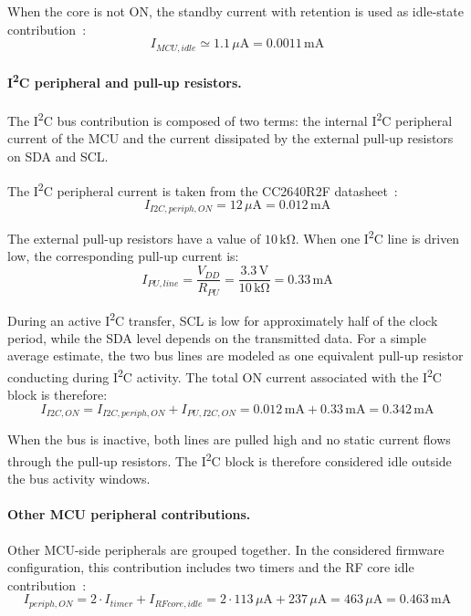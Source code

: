 When the core is not ON, the standby current with retention is used as idle-state contribution~\cite{mcu_datasheet}:
\begin{equation}
	I_{MCU,idle} \simeq 1.1\,\mu\mathrm{A} = 0.0011\,\mathrm{mA}
\end{equation}

\paragraph{I\textsuperscript{2}C peripheral and pull-up resistors.}
The I\textsuperscript{2}C bus contribution is composed of two terms: the internal I\textsuperscript{2}C peripheral current of the MCU and the current dissipated by the external pull-up resistors on SDA and SCL.

The I\textsuperscript{2}C peripheral current is taken from the CC2640R2F datasheet~\cite{mcu_datasheet}:
\begin{equation}
	I_{I2C,periph,ON} = 12\,\mu\mathrm{A} = 0.012\,\mathrm{mA}
\end{equation}

The external pull-up resistors have a value of \(10\,\mathrm{k\Omega}\). 
When one I\textsuperscript{2}C line is driven low, the corresponding pull-up current is:
\begin{equation}
	I_{PU,line} = \frac{V_{DD}}{R_{PU}} = \frac{3.3\,\mathrm{V}}{10\,\mathrm{k\Omega}} = 0.33\,\mathrm{mA}
\end{equation}

During an active I\textsuperscript{2}C transfer, SCL is low for approximately half of the clock period, while the SDA level depends on the transmitted data. 
For a simple average estimate, the two bus lines are modeled as one equivalent pull-up resistor conducting during I\textsuperscript{2}C activity. 
The total ON current associated with the I\textsuperscript{2}C block is therefore:
\begin{equation}
	I_{I2C,ON} = I_{I2C,periph,ON} + I_{PU,I2C,ON}
	= 0.012\,\mathrm{mA} + 0.33\,\mathrm{mA}
	= 0.342\,\mathrm{mA}
\end{equation}

When the bus is inactive, both lines are pulled high and no static current flows through the pull-up resistors. 
The I\textsuperscript{2}C block is therefore considered idle outside the bus activity windows.

\paragraph{Other MCU peripheral contributions.}
Other MCU-side peripherals are grouped together. 
In the considered firmware configuration, this contribution includes two timers and the RF core idle contribution~\cite{mcu_datasheet}:
\begin{equation}
	I_{periph,ON} = 2 \cdot I_{timer} + I_{RFcore,idle}
	= 2 \cdot 113\,\mu\mathrm{A} + 237\,\mu\mathrm{A}
	= 463\,\mu\mathrm{A}
	= 0.463\,\mathrm{mA}
\end{equation}

